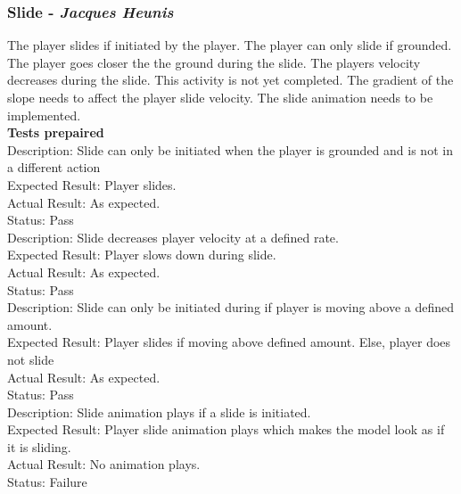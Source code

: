 \documentclass[a4paper,10pt]{article}
\begin{document}
\subsubsection{Slide - \textit{Jacques Heunis}}
The player slides if initiated by the player. The player can only slide if grounded. The player goes closer the the ground during the slide. The players velocity decreases during the slide. This activity is not yet completed. The gradient of the slope needs to affect the player slide velocity. The slide animation needs to be implemented.
\smallskip\\\textbf{Tests prepaired}\\
Description: Slide can only be initiated when the player is grounded and is not in a different action\\
Expected Result: Player slides.\\
Actual Result:  As expected.\\
Status: Pass
\smallskip\\
Description: Slide decreases player velocity at a defined rate. \\
Expected Result: Player slows down during slide.\\
Actual Result:  As expected.\\
Status: Pass
\smallskip\\
Description: Slide can only be initiated during if player is moving above a defined amount. \\
Expected Result: Player slides if moving above defined amount. Else, player does not slide\\
Actual Result:  As expected.\\
Status: Pass
\smallskip\\
Description: Slide animation plays if a slide is initiated. \\
Expected Result: Player slide animation plays which makes the model look as if it is sliding.\\
Actual Result: No animation plays.\\
Status: Failure
\end{document}
